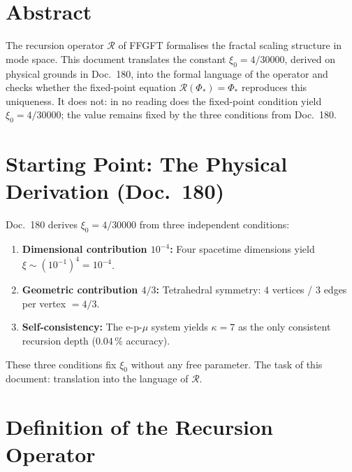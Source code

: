 
\section*{Abstract}

The recursion operator $\mathcal{R}$ of FFGFT formalises the
fractal scaling structure in mode space. This document translates
the constant $\xi_0 = 4/30000$, derived on physical grounds in Doc.~180,
into the formal language of the operator and checks whether
the fixed-point equation $\mathcal{R}(\Phi_*) = \Phi_*$ reproduces
this uniqueness. It does not: in no reading does the fixed-point
condition yield $\xi_0 = 4/30000$; the value remains fixed by the
three conditions from Doc.~180.

\section{Starting Point: The Physical Derivation (Doc.~180)}

Doc.~180 derives $\xi_0 = 4/30000$ from three independent conditions:

\begin{enumerate}
  \item \textbf{Dimensional contribution $10^{-4}$:}
    Four spacetime dimensions yield $\xi \sim (10^{-1})^4 = 10^{-4}$.
  \item \textbf{Geometric contribution $4/3$:}
    Tetrahedral symmetry: $4$ vertices / $3$ edges per vertex $= 4/3$.
  \item \textbf{Self-consistency:}
    The e-p-$\mu$ system yields $\kappa = 7$ as the only
    consistent recursion depth ($0.04\,\%$ accuracy).
\end{enumerate}

These three conditions fix $\xi_0$ without any free parameter.
The task of this document: translation into the language of $\mathcal{R}$.

\section{Definition of the Recursion Operator}

